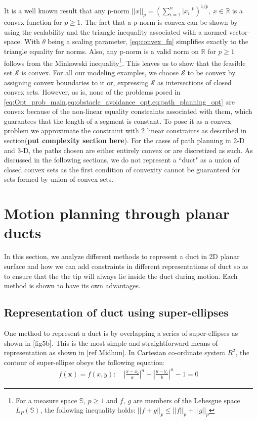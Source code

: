 \documentclass[12pt,a4]{article}
\begin{document}
It is a well known result that any p-norm $||x||_p=(\sum\limits_{i=1}^{n}|x_i|^p)^{1/p},~ x\in \mathbb{R}$ is a convex function for $p\geq 1$. The fact that a p-norm is convex can be shown by using the scalability and the triangle inequality associated with a normed vector-space. With $\theta$  being a scaling parameter, \cref{eq:convex_fn} simplifies exactly to the triangle equality for norms. Also, any p-norm is a valid norm on $\mathbb{R}$ for $p\geq1$ follows from the Minkowski inequality\footnote{For a measure space $\mathbb{S}$, $p\geq 1$ and $f,~g$ are members of the Lebesgue space $L_P(\mathbb{S})$, the following inequality holds: $||f+g||_p\leq ||f||_p+||g||_p$ }. This leaves us to show that the feasible set $\mathcal{S}$ is convex. For all our modeling examples, we choose $\mathcal{S}$ to be convex by assigning convex boundaries to it or, expressing $\mathcal{S}$ as intersections of closed convex sets.  However, as is, none of the problems posed in \cref{eq:Opt_prob_main,eq:obstacle_avoidance_opt,eq:path_planning_opt} are convex because of the non-linear equality constraints associated with them, which guarantees that the length of a segment is constant. To pose it as a convex problem we approximate the constraint with 2 linear constraints as described in section(\textbf{put complexity section here}). For the cases of path planning in 2-D and 3-D, the paths chosen are either entirely convex or are discretized as such. As discussed in the following sections, we do not represent a ``duct" as a union of closed convex sets as the first condition of convexity cannot be guaranteed for sets formed by union of convex sets. 

\section{Motion planning through planar ducts}
%
In this section, we analyze different methods to represent a duct in 2D planar surface and how we can add constraints in different representations of duct so as to ensure that the the tip will always lie inside the duct during motion. Each method is shown to have its own advantages.
\subsection{Representation of duct using super-ellipses}
%
One method to represent a duct is by overlapping a series of super-ellipses as shown in [fig5b]. This is the most simple and straightforward means of representation as shown in [ref Midhun]. In Cartesian co-ordinate system $R^2$, the contour of super-ellipse obeys the following equation:
\begin{align}
f(\textbf{x})= f(x,y):\quad \left \vert \frac{x-x_c}{a} \right\vert^n+\left\vert \frac{y-y_c}{b} \right\vert^n-1=0
\end{align}
\end{document}
